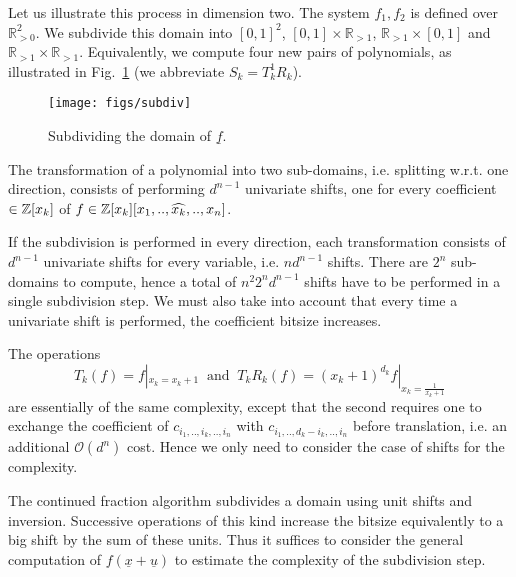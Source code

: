 \documentclass{sig-alternate}
\newcommand{\dott}{{..}}
\def\RR{\mathbb{R}}
\newcommand{\OO}{\ensuremath{\mathcal{O}}\xspace}
\newcommand{\uvec}[1]{\underline{#1}}
\begin{document}
 Let us illustrate this process in dimension
two. The system $f_1, f_2$ is defined over $\RR^2_{>0}$. We subdivide this
domain into $[0,1]^2$, $[0,1]\times \RR_{>1}$, $\RR_{>1}\times [0,1]$ and
$\RR_{>1}\times\RR_{>1}$. Equivalently, we compute four new pairs of
polynomials, as illustrated in Fig.~\ref{fig:subdiv} (we abbreviate
$S_k=T_k^{1}R_k$).
\begin{figure}[h]
  \centering
  \texttt{[image: figs/subdiv]}
  \caption{Subdividing the domain of $\uvec f$.}
  \label{fig:subdiv}
\end{figure}




The transformation of a polynomial into two sub-domains,
i.e. splitting w.r.t. one direction, consists of performing $d^{n-1}$
univariate shifts, one for every coefficient $\in {\mathbb Z}[x_k]$ of
$f \in \ZZ[x_k][x_1,\dott,\widehat{x_k},\dott, x_n] $.

If the subdivision is performed in every direction, each
transformation consists of $d^{n-1}$ univariate shifts for every
variable, i.e. $nd^{n-1}$ shifts. There are $2^n$ sub-domains to
compute, hence a total of $n^2 2^n d^{n-1} $ shifts have to be
performed in a single subdivision step. We must also take into account
that every time a univariate shift is performed, the coefficient
bitsize increases.

The operations 
$$
T_k(f)= f|_{x_k=x_k+1} \ \text{ and } \ 
T_kR_k(f)=(x_k+1)^{d_k} f|_{x_k=\frac{1}{x_k+1}}
$$
are essentially of the same complexity, except that the second
requires one to exchange the coefficient of $c_{i_1,\dott,i_k,\dott,i_n}$
with $c_{i_1,\dott,d_k-i_k,\dott,i_n}$ before translation, i.e. an
additional $\OO(d^n)$ cost. Hence we only need to consider the case of
shifts for the complexity.

The continued fraction algorithm subdivides a domain using unit shifts
and inversion.  Successive operations of this kind increase the bitsize
equivalently to a big shift by the sum of these units. Thus it
suffices to consider the general computation of $f(\uvec x + \uvec u)$
to estimate the complexity of the subdivision step.
\end{document}

